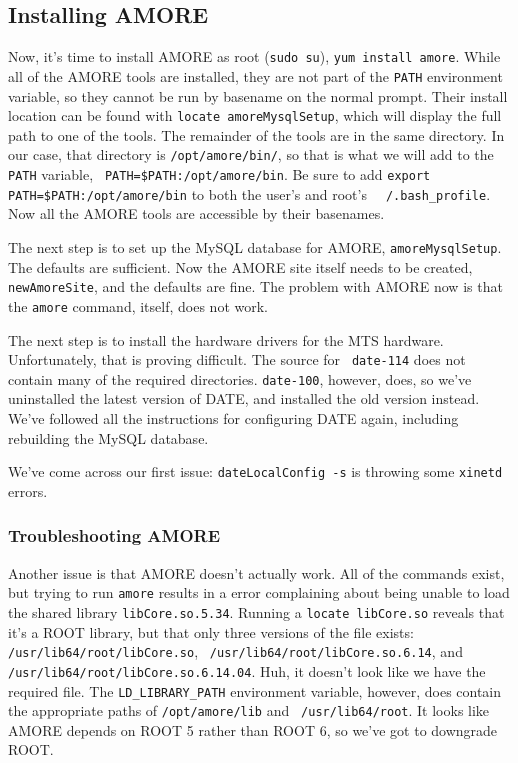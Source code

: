 \documentclass[12pt]{article}
\begin{document}
\subsection{Installing AMORE}

\qq Now, it's time to install AMORE as root ({\tt sudo su}), {\tt yum install
  amore}. While all of the AMORE tools are installed, they are not part of the
{\tt PATH} environment variable, so they cannot be run by basename on the normal
prompt. Their install location can be found with {\tt locate amoreMysqlSetup},
which will display the full path to one of the tools. The remainder of the tools
are in the same directory. In our case, that directory is {\tt /opt/amore/bin/},
so that is what we will add to the {\tt PATH} variable, {\tt
  PATH=\$PATH:/opt/amore/bin}. Be sure to add {\tt export
  PATH=\$PATH:/opt/amore/bin} to both the user's and root's {\tt
  ~/.bash\_profile}. Now all the AMORE tools are accessible by their
basenames.

\qq The next step is to set up the MySQL database for AMORE, {\tt amoreMysqlSetup}.
The defaults are sufficient. Now the AMORE site itself needs to be created, {\tt
  newAmoreSite}, and the defaults are fine. The problem with AMORE now is that
the {\tt amore} command, itself, does not work.

\qq The next step is to install the hardware drivers for the MTS
hardware. Unfortunately, that is proving difficult. The source for {\tt
  date-114} does not contain many of the required directories. {\tt date-100},
however, does, so we've uninstalled the latest version of DATE, and installed
the old version instead. We've followed all the instructions for configuring
DATE again, including rebuilding the MySQL database.

\qq We've come across our first issue: {\tt dateLocalConfig -s} is throwing some
{\tt xinetd} errors.

\subsubsection{Troubleshooting AMORE}

\qq Another issue is that AMORE doesn't actually work. All of the commands
exist, but trying to run {\tt amore} results in a error complaining about being
unable to load the shared library {\tt libCore.so.5.34}. Running a {\tt locate
  libCore.so} reveals that it's a ROOT library, but that only three versions of
the file exists: {\tt /usr/lib64/root/libCore.so}, {\tt
  /usr/lib64/root/libCore.so.6.14}, and {\tt
  /usr/lib64/root/libCore.so.6.14.04}. Huh, it doesn't look like we have the
required file. The {\tt LD\_LIBRARY\_PATH} environment variable, however, does
contain the appropriate paths of {\tt /opt/amore/lib} and {\tt
  /usr/lib64/root}. It looks like AMORE depends on ROOT 5 rather than ROOT 6, so
we've got to downgrade ROOT.
\end{document}
